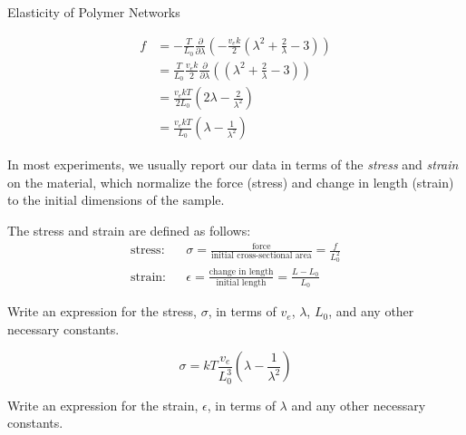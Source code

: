 \begin{activity}{Elasticity of Polymer Networks}
\begin{ctqs}
			\begin{solution}[2.5in]
			
				\begin{align*}
					f &= -\frac{T}{L_0}\frac{\partial}{\partial \lambda} \left(-\frac{v_e k}{2}\left(\lambda^2 + \frac{2}{\lambda} - 3\right)\right)\\
						&= \frac{T}{L_0}\frac{v_e k}{2}\frac{\partial}{\partial \lambda} \left(\left(\lambda^2 + \frac{2}{\lambda} - 3\right)\right)\\
						&= \frac{v_e k T}{2 L_0}\left(2\lambda - \frac{2}{\lambda^2} \right)\\
						&= \frac{v_e k T}{L_0}\left(\lambda - \frac{1}{\lambda^2} \right)
				\end{align*}
			\end{solution}
	
\end{ctqs}

\begin{model}

	In most experiments, we usually report our data in terms of the \emph{stress} and \emph{strain} on the material, which normalize the force (stress) and change in length (strain) to the initial dimensions of the sample.
	
	The stress and strain are defined as follows:
	\begin{align*}
		\text{stress:} && \sigma = \frac{\text{force}}{\text{initial cross-sectional area}} = \frac{f}{L_0^2} \\
		\text{strain:} && \epsilon = \frac{\text{change in length}}{\text{initial length}} = \frac{L-L_0}{L_0}
	\end{align*}
	
\end{model}

\begin{ctqs}

	\question Write an expression for the stress, $\sigma$, in terms of $v_e$, $\lambda$, $L_0$, and any other necessary constants.
	
		\begin{solution}[0.8in]
			\begin{equation*}
				\sigma = kT\frac{v_e}{L_0^3}\left(\lambda - \frac{1}{\lambda^2}\right)
			\end{equation*}
		\end{solution}

	\question Write an expression for the strain, $\epsilon$, in terms of $\lambda$ and any other necessary constants.
	

\end{ctqs}
\end{activity}
